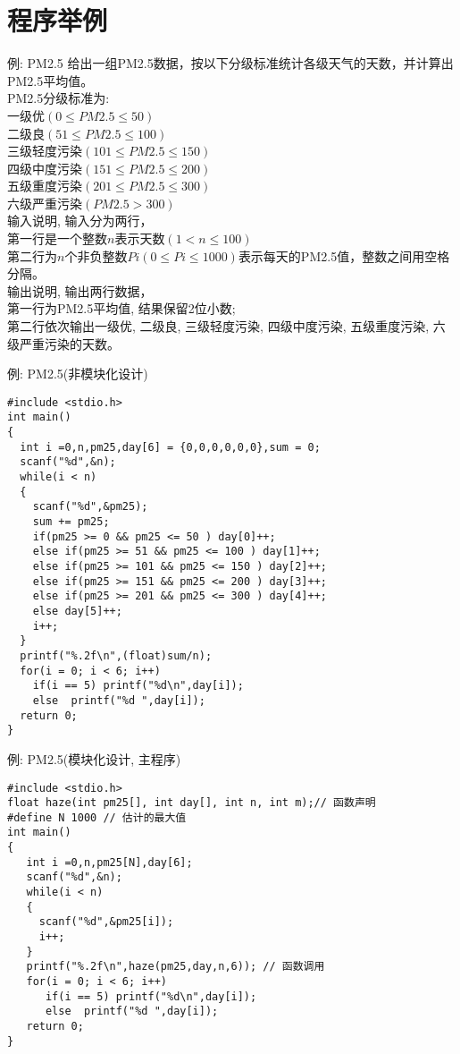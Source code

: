 \section{程序举例}

\begin{frame}{例: PM2.5}
给出一组PM2.5数据，按以下分级标准统计各级天气的天数，并计算出PM2.5平均值。\\ 
PM2.5分级标准为:\\ 
一级优$(0\le PM2.5\le 50)$\\ 
二级良$(51\le PM2.5\le 100)$\\  
三级轻度污染$(101\le PM2.5\le 150)$\\ 
四级中度污染$(151\le PM2.5\le 200)$\\  
五级重度污染$(201\le PM2.5\le 300)$\\ 
六级严重污染$(PM2.5>300)$\\  

输入说明, 输入分为两行，\\ 
第一行是一个整数$n$表示天数$(1<n\le 100)$ \\
第二行为$n$个非负整数$Pi(0\le Pi\le 1000)$表示每天的PM2.5值，整数之间用空格分隔。\\
输出说明, 输出两行数据，\\ 
第一行为PM2.5平均值, 结果保留2位小数;\\ 
第二行依次输出一级优, 二级良, 三级轻度污染, 四级中度污染, 五级重度污染, 六级严重污染的天数。
\end{frame}

\begin{frame}{例: PM2.5(非模块化设计)}
\begin{lstlisting}
#include <stdio.h>
int main()
{
  int i =0,n,pm25,day[6] = {0,0,0,0,0,0},sum = 0;
  scanf("%d",&n);
  while(i < n) 
  {
    scanf("%d",&pm25);
    sum += pm25;
    if(pm25 >= 0 && pm25 <= 50 ) day[0]++;
    else if(pm25 >= 51 && pm25 <= 100 ) day[1]++;
    else if(pm25 >= 101 && pm25 <= 150 ) day[2]++;
    else if(pm25 >= 151 && pm25 <= 200 ) day[3]++;
    else if(pm25 >= 201 && pm25 <= 300 ) day[4]++;
    else day[5]++;
    i++;
  } 
  printf("%.2f\n",(float)sum/n);
  for(i = 0; i < 6; i++)
    if(i == 5) printf("%d\n",day[i]);
    else  printf("%d ",day[i]);
  return 0;
} 
\end{lstlisting}
\end{frame}

\begin{frame}{例: PM2.5(模块化设计, 主程序)}
\begin{lstlisting}
#include <stdio.h>
float haze(int pm25[], int day[], int n, int m);// 函数声明
#define N 1000 // 估计的最大值
int main()
{
   int i =0,n,pm25[N],day[6];
   scanf("%d",&n);
   while(i < n) 
   {
     scanf("%d",&pm25[i]);
     i++;
   } 
   printf("%.2f\n",haze(pm25,day,n,6)); // 函数调用
   for(i = 0; i < 6; i++)
      if(i == 5) printf("%d\n",day[i]);
      else  printf("%d ",day[i]);
   return 0;
} 
\end{lstlisting}
\end{frame}

